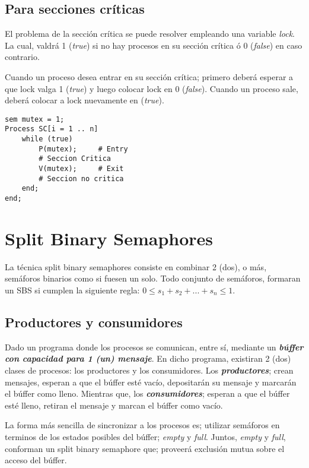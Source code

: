 \documentclass[a4paper, 10pt, margin=0in]{report}
\begin{document}
\subsection{Para secciones críticas}

El problema de la sección crítica se puede resolver empleando una variable \emph{lock}. La cual, valdrá 1 (\emph{true}) si no hay procesos en su sección crítica ó 0 (\emph{false}) en caso contrario.

Cuando un proceso desea entrar en su sección crítica; primero deberá esperar a que lock valga 1 (\emph{true}) y luego colocar lock en 0 (\emph{false}). Cuando un proceso sale, deberá colocar a lock nuevamente en (\emph{true}).

\begin{lstlisting}
sem mutex = 1;
Process SC[i = 1 .. n]
    while (true)
        P(mutex);     # Entry
        # Seccion Critica
        V(mutex);     # Exit
        # Seccion no critica
    end;
end;
\end{lstlisting}

\section{Split Binary Semaphores}

La técnica split binary semaphores consiste en combinar 2 (dos), o más, semáforos binarios como si fuesen un solo. Todo conjunto de semáforos, formaran un SBS si cumplen la siguiente regla: $0 \leq s_{1} + s_{2} + ... + s_{n} \leq 1$.

\subsection{Productores y consumidores}

Dado un programa donde los procesos se comunican, entre sí, mediante un \textbf{\emph{búffer con capacidad para 1 (un) mensaje}}. En dicho programa, existiran 2 (dos) clases de procesos: los productores y los consumidores. Los \textbf{\emph{productores}}; crean mensajes, esperan a que el búffer esté vacío, depositarán su mensaje y marcarán el búffer como lleno. Mientras que, los \textbf{\emph{consumidores}}; esperan a que el búffer esté lleno, retiran el mensaje y marcan el búffer como vacío.

La forma más sencilla de sincronizar a los procesos es; utilizar semáforos en terminos de los estados posibles del búffer; \emph{empty} y \emph{full}. Juntos, \emph{empty} y \emph{full}, conforman un split binary semaphore que; proveerá exclusión mutua sobre el acceso del búffer.
\end{document}
